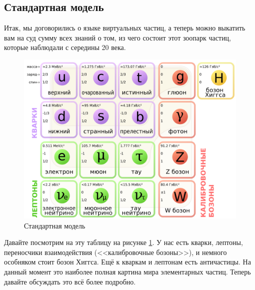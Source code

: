 \documentclass[12pt]{article}
\begin{document}
\subsection{Стандартная модель}
Итак, мы договорились о языке виртуальных частиц, а теперь можно выкатить вам на суд сумму всех знаний о том, из чего состоит этот зоопарк частиц, которые наблюдали с середины 20 века.
\begin{figure}[h]
    \centering
    \includegraphics[scale=0.43,keepaspectratio]{Seminar_11-12/pics/pic_01_standart_model.png}
    \caption{Стандартная модель}
    \label{fig:sem_11_model}
\end{figure}

\vspace{1em} \noindent
Давайте посмотрим на эту таблицу  на рисунке \ref{fig:sem_11_model}. У нас есть кварки, лептоны, переносчики взаимодействия (<<калибровочные бозоны>>), и немного особняком стоит бозон Хиггса. Ещё к кваркам и лептонам есть античастицы. На данный момент это наиболее полная картина мира элементарных частиц. Теперь давайте обсуждать это всё более подробно.
\end{document}
